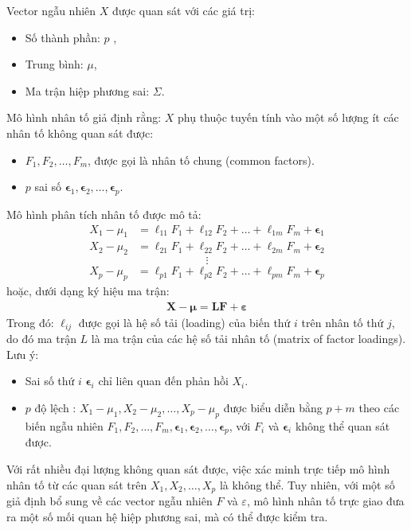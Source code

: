 Vector ngẫu nhiên \(X\) được quan sát với các giá trị:
\begin{itemize}
\item Số thành phần: \(p\) ,
\item Trung bình: \(\mu\),
\item Ma trận hiệp phương sai: \(\Sigma\).
\end{itemize}
Mô hình nhân tố giả định rằng: \(X\) phụ thuộc tuyến tính vào một số lượng ít các nhân tố không quan sát được:
\begin{itemize}
\item \(F_1, F_2, \ldots, F_m\), được gọi là nhân tố chung (common factors).
\item \(p\) sai số  \(\boldsymbol{\epsilon}_1, \boldsymbol{\epsilon}_2, \ldots, \boldsymbol{\epsilon}_p\).
\end{itemize}
Mô hình phân tích nhân tố được mô tả:
\begin{eqnarray}
X_1 - \mu_1 &= \ell_{11}F_1 + \ell_{12}F_2 + \ldots + \ell_{1m}F_m + \boldsymbol{\epsilon}_1\\
X_2 - \mu_2 &= \ell_{21}F_1 + \ell_{22}F_2 + \ldots + \ell_{2m}F_m + \boldsymbol{\epsilon}_2
\end{eqnarray}
\[\vdots\]
\begin{eqnarray}
X_p - \mu_p &= \ell_{p1}F_1 + \ell_{p2}F_2 + \ldots + \ell_{pm}F_m + \boldsymbol{\epsilon}_p
\end{eqnarray}
hoặc, dưới dạng ký hiệu ma trận:
\begin{eqnarray}
\mathbf{X} - \boldsymbol{\mu} = \mathbf{L}\mathbf{F} + \boldsymbol{\varepsilon}
\end{eqnarray}
Trong đó: \(\ell_{ij}\) được gọi là hệ số tải (loading) của biến thứ \(i\) trên nhân tố thứ \(j\), do đó ma trận \(L\) là ma trận của các hệ số tải nhân tố (matrix of factor loadings).
Lưu ý: 
\begin{itemize}
    \item Sai số thứ \(i\) \(\boldsymbol{\epsilon}_i\) chỉ liên quan đến phản hồi \(X_i\).
    \item \(p\) độ lệch : \(X_1 - \mu_1, X_2 - \mu_2, \ldots, X_p - \mu_p\) được biểu diễn bằng \(p + m\) theo các biến ngẫu nhiên  \(F_1, F_2, \ldots, F_m, \boldsymbol{\epsilon}_1, \boldsymbol{\epsilon}_2, \ldots, \boldsymbol{\epsilon}_p\), với \(F_i\) và \(\boldsymbol{\epsilon}_i\) không thể quan sát được.
\end{itemize}

Với rất nhiều đại lượng không quan sát được, việc xác minh trực tiếp mô hình nhân tố từ các quan sát trên \(X_1, X_2, \ldots, X_p\) là không thể. Tuy nhiên, với một số giả định bổ sung về các vector ngẫu nhiên \(F\) và \(\varepsilon\), mô hình nhân tố trực giao đưa ra một số mối quan hệ hiệp phương sai, mà có thể được kiểm tra.

